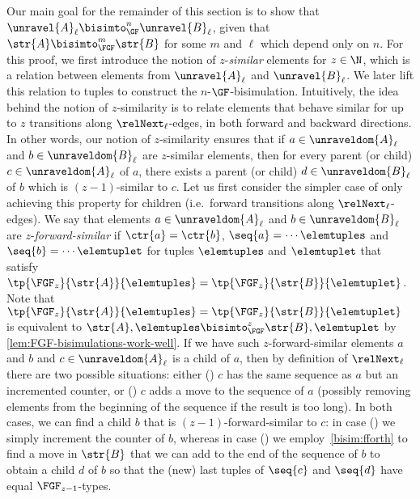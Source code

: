 Our main goal for the remainder of this section is to show that $\unravel{A}_{\ell} \bisimto_{\GF}^{n} \unravel{B}_{\ell}$, given that $\str{A} \bisimto_{\FGF}^{m} \str{B}$ for some $m$ and $\ell$ which depend only on $n$.
For this proof, we first introduce the notion of $z$-\emph{similar} elements for $z \in \N$, which is a relation between elements from $\unravel{A}_{\ell}$ and $\unravel{B}_{\ell}$.
We later lift this relation to tuples to construct the $n$-$\GF$-bisimulation.
Intuitively, the idea behind the notion of $z$-similarity is to relate elements that behave similar for up to $z$ transitions along $\relNext_{\ell}$-edges, in both forward and backward directions.
In other words, our notion of $z$-similarity ensures that if $a \in \unraveldom{A}_{\ell}$ and $b \in \unraveldom{B}_{\ell}$ are $z$-similar elements, then for every parent (or child) $c \in \unraveldom{A}_{\ell}$ of $a$, there exists a parent (or child) $d \in \unraveldom{B}_{\ell}$ of $b$ which is $(z{-}1)$-similar to $c$.
Let us first consider the simpler case of only achieving this property for children (i.e.\ forward transitions along $\relNext_{\ell}$-edges).
We say that elements $a \in \unraveldom{A}_{\ell}$ and $b \in \unraveldom{B}_{\ell}$ are $z$-\emph{forward-similar} if $\ctr{a} = \ctr{b}$, $\seq{a} = \cdots \elemtuples$ and $\seq{b} = \cdots \elemtuplet$ for tuples $\elemtuples$ and $\elemtuplet$ that satisfy $\tp{\FGF_{z}}{\str{A}}{\elemtuples} = \tp{\FGF_{z}}{\str{B}}{\elemtuplet}$.
Note that $\tp{\FGF_{z}}{\str{A}}{\elemtuples} = \tp{\FGF_{z}}{\str{B}}{\elemtuplet}$ is equivalent to $\str{A}, \elemtuples \bisimto_{\FGF}^{z} \str{B}, \elemtuplet$ by \cref{lem:FGF-bisimulations-work-well}.
If we have such $z$-forward-similar elements $a$ and $b$ and $c \in \unraveldom{A}_{\ell}$ is a child of $a$, then by definition of $\relNext_{\ell}$ there are two possible situations: either () $c$ has the same sequence as $a$ but an incremented counter, or () $c$ adds a move to the sequence of $a$ (possibly removing elements from the beginning of the sequence if the result is too long).
In both cases, we can find a child $b$ that is $(z{-}1)$-forward-similar to $c$: in case () we simply increment the counter of $b$, whereas in case () we employ~\ref{bisim:fforth} to find a move in $\str{B}$ that we can add to the end of the sequence of $b$ to obtain a child $d$ of $b$ so that the (new) last tuples of $\seq{c}$ and $\seq{d}$ have equal $\FGF_{z{-}1}$-types.

